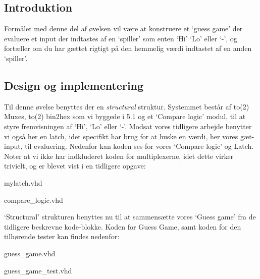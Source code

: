 \documentclass[../journal.tex]{subfiles}
\begin{document}
\subsection{Introduktion}
Formålet med denne del af øvelsen vil være at konstruere et `guess game' der evaluere et input der indtastes af en `spiller' som enten `Hi' `Lo' eller `-', og fortæller om du har gættet rigtigt på den hemmelig værdi indtastet af en anden `spiller'.

\subsection{Design og implementering}
Til denne øvelse benyttes der en \textit{structural} struktur. Systemmet består af to(2) Muxes, to(2) bin2hex som vi byggede i 5.1 og et `Compare logic' modul, til at styre fremvisningen af `Hi', `Lo' eller `-'. Modsat vores tidligere arbejde benytter vi også her en latch, idet specifikt har brug for at huske en værdi, her vores gæt-input, til evaluering. Nedenfor kan koden ses for vores `Compare logic' og Latch. Noter at vi ikke har indkluderet koden for multiplexerne, idet dette virker trivielt, og er blevet vist i en tidligere opgave:

\begin{table}[H]
    \centering
      \framebox{
        \rule{8pt}{0pt}
          
  }
  \caption{mylatch.vhd}	
  \label{src:mylatch}
\end{table}

\begin{table}[H]
    \centering
      \framebox{
        \rule{8pt}{0pt}
          
  }
  \caption{compare\_logic.vhd}
  \label{src:compare_logic}
\end{table}

`Structural' strukturen benyttes nu til at sammensætte vores `Guess game' fra de tidligere beskrevne kode-blokke. Koden for Guess Game, samt koden for den tilhørende tester kan findes nedenfor:

\begin{table}[H]
    \centering
      \framebox{
        \rule{8pt}{0pt}
          
  }
  \caption{guess\_game.vhd}	
  \label{src:guess_game}
\end{table}

\begin{table}[H]
  \centering
    \framebox{
      \rule{8pt}{0pt}
        
}
\caption{guess\_game\_test.vhd}	
\label{src:guess_game_test}
\end{table}
\end{document}
